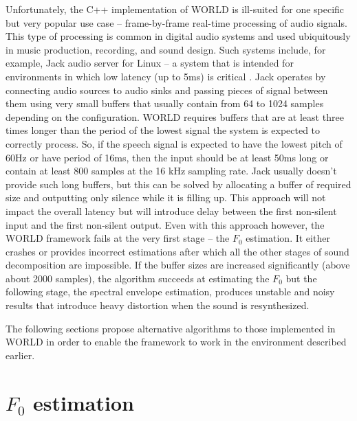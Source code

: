 \documentclass[a4paper]{article}
\begin{document}
Unfortunately, the C++ implementation of WORLD is ill-suited for one specific but very popular use case -- frame-by-frame real-time processing of audio signals. This type of processing is common in digital audio systems and used ubiquitously in music production, recording, and sound design. Such systems include, for example, Jack audio server for Linux -- a system that is intended for environments in which low latency (up to 5ms) is critical \cite{JACK}. Jack operates by connecting audio sources to audio sinks and passing pieces of signal between them using very small buffers that usually contain from 64 to 1024 samples depending on the configuration. WORLD requires buffers that are at least three times longer than the period of the lowest signal the system is expected to correctly process. So, if the speech signal is expected to have the lowest pitch of 60Hz or have period of 16ms, then the input should be at least 50ms long or contain at least 800 samples at the 16 kHz sampling rate. Jack usually doesn't provide such long buffers, but this can be solved by allocating a buffer of required size and outputting only silence while it is filling up. This approach will not impact the overall latency but will introduce delay between the first non-silent input and the first non-silent output. Even with this approach however, the WORLD framework fails at the very first stage -- the $F_0$ estimation. It either crashes or provides incorrect estimations after which all the other stages of sound decomposition are impossible. If the buffer sizes are increased significantly (above about 2000 samples), the algorithm succeeds at estimating the $F_0$ but the following stage, the spectral envelope estimation, produces unstable and noisy results that introduce heavy distortion when the sound is resynthesized.

The following sections propose alternative algorithms to those implemented in WORLD in order to enable the framework to work in the environment described earlier.

\section{$F_0$ estimation}
\end{document}
